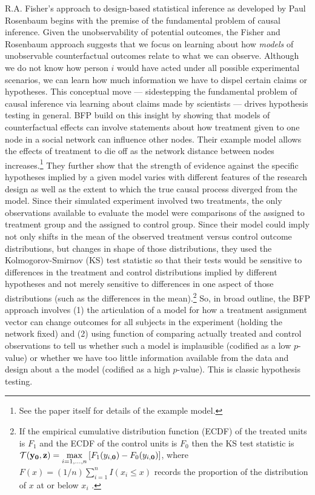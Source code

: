 R.A. Fisher's approach to design-based statistical inference  \citep[Chap
2]{fisher:1935} as developed by Paul Rosenbaum  \citep{rosenbaum2010design}
begins with the premise of the fundamental problem of causal inference. Given
the unobservability of potential outcomes, the Fisher and Rosenbaum approach
suggests that we focus on learning about how \emph{models} of unobservable
counterfactual outcomes relate to what we can observe. Although we do not know
how person $i$ would have acted under all possible experimental scenarios, we
can learn how much information we have to dispel certain claims or hypotheses.
This conceptual move --- sidestepping the fundamental problem of causal
inference via learning about claims made by scientists --- drives hypothesis
testing in general.  BFP build on this insight by showing that models of
counterfactual effects can involve statements about how treatment given to one
node in a social network can influence other nodes. Their
example model allows the effects of treatment to die off as the network
distance between nodes increases.\footnote{See the paper itself for details of
  the example model.} They further show that the strength of evidence
against the specific hypotheses implied by a given model varies with different
features of the research design as well as the extent to which the true causal
process diverged from the model. Since their simulated experiment involved
two treatments, the only observations available to evaluate the model
were comparisons of the assigned to treatment group and the assigned to
control group. Since their model could imply not only shifts in the mean of
the observed treatment versus control outcome distributions, but changes in
shape of those distributions, they used the Kolmogorov-Smirnov (KS) test
statistic so that their tests would be sensitive to differences in the treatment
and control distributions implied by different hypotheses and not merely
sensitive to differences in one aspect of those distributions (such as the
differences in the mean).\footnote{If the empirical cumulative distribution
  function (ECDF) of the treated units is $F_1$ and the ECDF of the control
  units is $F_0$ then the KS test statistic is $\mathcal{T}(\mathbf{y}_{\mathbf{0}},\mathbf{z}) = \underset{i =
    1,\ldots,n}{\text{max}}\left[F_1(y_{i,\mathbf{0}}) -
    F_0(y_{i,\mathbf{0}})\right]$, where $F(x)=(1/n)\sum_{i=1}^n I(x_i \le x)$
  records the proportion of the distribution of $x$ at or below $x_i$
  \citep[\S 5.4]{MylesHollander1999a}.} So, in broad outline, the BFP approach
involves (1) the articulation of a model for how a treatment assignment vector
can change outcomes for all subjects in the experiment (holding the network
fixed) and (2) using function of comparing actually treated and control
observations to tell us whether such a model is implausible (codified as a low
$p$-value)  or whether we have too little information available from the data
and design about a the model (codified as a high $p$-value). This is classic
hypothesis testing.

